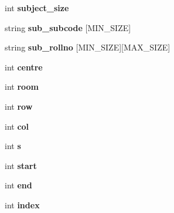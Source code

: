 \begin{DoxyCompactItemize}
\item 
\hypertarget{classSeatPlan_a096075ab35402baaddc0f142b8cca054}{int {\bfseries subject\-\_\-size}}\label{classSeatPlan_a096075ab35402baaddc0f142b8cca054}

\item 
\hypertarget{classSeatPlan_a78190c5ff5be236044b530205ef3646f}{string {\bfseries sub\-\_\-subcode} \mbox{[}M\-I\-N\-\_\-\-S\-I\-Z\-E\mbox{]}}\label{classSeatPlan_a78190c5ff5be236044b530205ef3646f}

\item 
\hypertarget{classSeatPlan_a8c79b8801cc093002615f477c7567c28}{string {\bfseries sub\-\_\-rollno} \mbox{[}M\-I\-N\-\_\-\-S\-I\-Z\-E\mbox{]}\mbox{[}M\-A\-X\-\_\-\-S\-I\-Z\-E\mbox{]}}\label{classSeatPlan_a8c79b8801cc093002615f477c7567c28}

\item 
\hypertarget{classSeatPlan_a55052a9b7a637609f439a003b0957552}{int {\bfseries centre}}\label{classSeatPlan_a55052a9b7a637609f439a003b0957552}

\item 
\hypertarget{classSeatPlan_ab01207ceddc85e4535874e2db71e36e3}{int {\bfseries room}}\label{classSeatPlan_ab01207ceddc85e4535874e2db71e36e3}

\item 
\hypertarget{classSeatPlan_afcff743dbcb0e5c364cac4570730ad25}{int {\bfseries row}}\label{classSeatPlan_afcff743dbcb0e5c364cac4570730ad25}

\item 
\hypertarget{classSeatPlan_a959c1e5ee849ea93b5f46a98d4f45060}{int {\bfseries col}}\label{classSeatPlan_a959c1e5ee849ea93b5f46a98d4f45060}

\item 
\hypertarget{classSeatPlan_a31abf30876cae554e4a11f3b4892a93c}{int {\bfseries s}}\label{classSeatPlan_a31abf30876cae554e4a11f3b4892a93c}

\item 
\hypertarget{classSeatPlan_a03348c2da937f350737d7039dbd80cc8}{int {\bfseries start}}\label{classSeatPlan_a03348c2da937f350737d7039dbd80cc8}

\item 
\hypertarget{classSeatPlan_ade0c58a66a04c9f90803dee62954e15f}{int {\bfseries end}}\label{classSeatPlan_ade0c58a66a04c9f90803dee62954e15f}

\item 
\hypertarget{classSeatPlan_a2c85aa97b3681f2ba5e27af197836b26}{int {\bfseries index}}\label{classSeatPlan_a2c85aa97b3681f2ba5e27af197836b26}


\end{DoxyCompactItemize}
